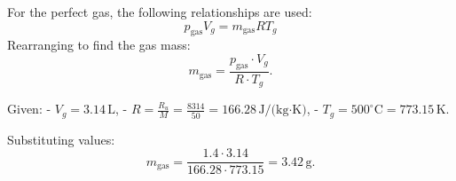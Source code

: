 For the perfect gas, the following relationships are used:  
\[
p_{\text{gas}} V_g = m_{\text{gas}} R T_g
\]  
Rearranging to find the gas mass:  
\[
m_{\text{gas}} = \frac{p_{\text{gas}} \cdot V_g}{R \cdot T_g}.
\]  

Given:  
- \( V_g = 3.14 \, \text{L} \),  
- \( R = \frac{R_u}{M} = \frac{8314}{50} = 166.28 \, \text{J/(kg·K)} \),  
- \( T_g = 500^\circ\text{C} = 773.15 \, \text{K} \).  

Substituting values:  
\[
m_{\text{gas}} = \frac{1.4 \cdot 3.14}{166.28 \cdot 773.15} = 3.42 \, \text{g}.
\]